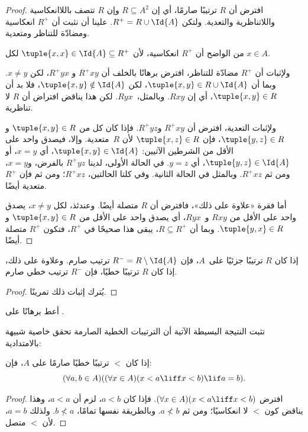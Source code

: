 \documentclass[../../../include/open-logic-section]{subfiles}
\begin{document}
\begin{proof}
افترض أن $R$ ترتيبًا صارمًا، أي إن $R \subseteq A^2$ وإن $R$ تتصف
باللاانعكاسية واللاتناظرية والتعدية. ولتكن $R^+ = R \cup \Id{A}$. علينا أن نثبت أن $R^+$
انعكاسية ومضادّة للتناظر ومتعدية.

من الواضح أن $R^+$ انعكاسية، لأن $\tuple{x, x} \in \Id{A} \subseteq
R^+$ لكل $x \in A$.

ولإثبات أن $R^+$ مضادّة للتناظر، افترض برهانًا بالخلف أن $R^+xy$ و
$R^+yx$، لكن $x \neq y$. وبما أن $\tuple{x,y} \in R \cup \Id{A}$، لكن
$\tuple{x, y} \notin \Id{A}$، فلا بد أن $\tuple{x, y} \in R$، أي إن
$Rxy$. وبالمثل،~$Ryx$. لكن هذا يناقض افتراض أن $R$ لا تناظرية.

ولإثبات التعدية، افترض أن $R^+xy$ و$R^+yz$. فإذا كان كل من
$\tuple{x, y} \in R$ و$\tuple{y,z} \in R$، فإن $\tuple{x, z} \in
R$ لأن $R$~متعدية. وإلا، فيصدق واحد على الأقل من الشرطين الآتيين:
$\tuple{x, y} \in \Id{A}$، أي $x = y$، أو $\tuple{y, z} \in \Id{A}$،
أي $y = z$.
في الحالة الأولى، لدينا $R^+yz$ بالفرض، و$x = y$، ومن ثم $R^+xz$.
وبالمثل في الحالة الثانية. وفي كلتا الحالتين، $R^+xz$؛ ومن ثم فإن
$R^+$ متعدية أيضًا.

أما فقرة «علاوة على ذلك»، فافترض أن $R$ متصلة أيضًا. وعندئذ، لكل
$x \neq y$، يصدق واحد على الأقل من $Rxy$ و~$Ryx$، أي يصدق واحد على الأقل
من $\tuple{x, y} \in R$ و$\tuple{y, x} \in R$. وبما أن $R \subseteq R^+$،
يبقى هذا صحيحًا في $R^+$، فتكون $R^+$ متصلة أيضًا.
\end{proof}

\begin{prop}
إذا كان $R$ ترتيبًا جزئيًا على~$A$، فإن $R^- = R \setminus \Id{A}$ ترتيب
صارم. وعلاوة على ذلك، إذا كان $R$ ترتيبًا خطيًا، فإن $R^-$ ترتيب خطي
صارم.
\end{prop}

\begin{proof}
يُترك إثبات ذلك تمرينًا.
\end{proof}

\begin{prob}
أعط برهانًا على .
\end{prob}

تثبت النتيجة البسيطة الآتية أن الترتيبات الخطية الصارمة تحقق خاصية شبيهة
بالامتدادية:

\begin{prop}
إذا كان $<$ ترتيبًا خطيًا صارمًا على $A$، فإن:
\[
  (\forall a, b \in A)((\forall x \in A)(x < a \liff x < b) \lif a = b).
\]
\end{prop}

\begin{proof}
افترض $(\forall x \in A)(x < a \liff x < b)$. فإذا كان $a < b$، لزم أن
$a < a$، وهذا يناقض كون $<$ لا انعكاسيًا؛ ومن ثم $a \nless b$. وبالطريقة
نفسها تمامًا، $b \nless a$. ولذلك $a = b$، لأن $<$ متصل.
\end{proof}
\end{document}
